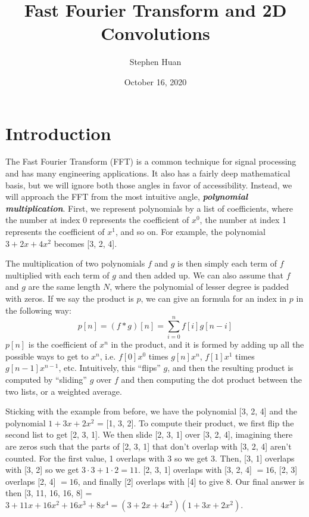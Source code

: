 \documentclass[11pt, oneside]{article}
\title{Fast Fourier Transform and 2D Convolutions}
\author{Stephen Huan}
\date{October 16, 2020}
\newcommand{\emphasis}[1]{\textbf{\textit{#1}}}
\theoremstyle{plain}
\theoremstyle{definition}
\begin{document}
\maketitle

\section{Introduction}

The Fast Fourier Transform (FFT) is a common technique for signal processing
and has many engineering applications. It also has a fairly deep mathematical
basis, but we will ignore both those angles in favor of accessibility.
Instead, we will approach the FFT from the most intuitive angle,
\emphasis{polynomial multiplication}.
First, we represent polynomials by a list of coefficients,
where the number at index 0 represents the coefficient of \( x^0 \),
the number at index 1 represents the coefficient of \( x^1 \), and so on.
For example, the polynomial \( 3 + 2x + 4x^2 \) becomes [3, 2, 4].

The multiplication of two polynomials \( f \) and \( g \) is then simply
each term of \( f \) multiplied with each term of \( g \) and then added up.
We can also assume that \( f \) and \( g \) are the same length \( N \),
where the polynomial of lesser degree is padded with zeros.
If we say the product is \( p \), we can give an formula
for an index in \( p \) in the following way:
\[ p[n] = (f * g)[n] = \sum^n_{i = 0} f[i]g[n - i] \]
\( p[n] \) is the coefficient of \( x^n \) in the product, and it is formed
by adding up all the possible ways to get to \( x^n \), i.e. \( f[0] x^0 \)
times \( g[n] x^n \), \( f[1] x^1 \) times \( g[n - 1] x^{n - 1} \), etc.
Intuitively, this \enquote{flips} \( g \), and then the resulting product
is computed by \enquote{sliding} \( g \) over \( f \) and then computing
the dot product between the two lists, or a weighted average.

Sticking with the example from before, we have the polynomial [3, 2, 4]
and the polynomial \( 1 + 3x + 2x^2 \) = [1, 3, 2]. To compute their
product, we first flip the second list to get [2, 3, 1]. We then slide [2, 3, 1]
over [3, 2, 4], imagining there are zeros such that the parts of [2, 3, 1]
that don't overlap with [3, 2, 4] aren't counted.
For the first value, 1 overlaps with 3 so we get 3. 
Then, [3, 1] overlaps with [3, 2] so we get \( 3 \cdot 3 + 1 \cdot 2 = 11 \).
[2, 3, 1] overlaps with [3, 2, 4] \( = 16 \), [2, 3] overlaps [2, 4] \( = 16 \),
and finally [2] overlaps with [4] to give 8.
Our final answer is then [3, 11, 16, 16, 8] = \( 3 + 11x + 16x^2 + 16x^3 + 8x^4
= (3 + 2x + 4x^2)(1 + 3x + 2x^2) \).
\end{document}
